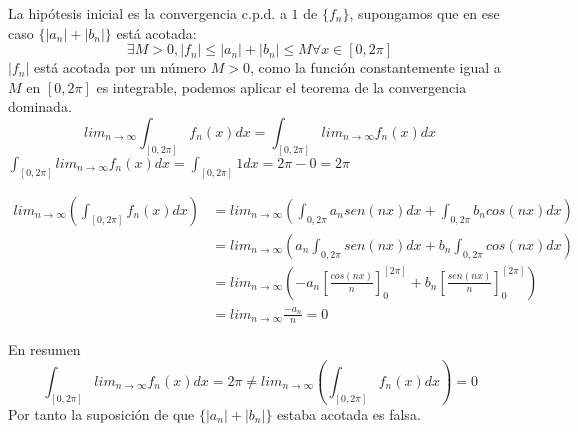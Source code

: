 
La hipótesis inicial es la convergencia c.p.d. a $1$ de $\{f_n\}$, supongamos que en ese caso $\{|a_n| + |b_n|\}$ está acotada:
\[\exists M>0, |f_n| \leq |a_n| + |b_n| \leq M \forall x\in [0, 2\pi] \]
$|f_n|$ está acotada por un número $M>0$, como la función constantemente igual a $M$ en $[0, 2\pi]$
es integrable, podemos aplicar el teorema de la convergencia dominada.
\[ lim_{n\to\infty}\int_{[0, 2\pi]} f_n(x)dx = \int_{[0, 2\pi]} lim_{n\to\infty} f_n(x)dx
\]
$ \int_{[0, 2\pi]} lim_{n\to\infty} f_n(x)dx = \int_{[0, 2\pi]} 1dx = 2\pi - 0 = 2\pi $

\begin{equation*}
\begin{split}
lim_{n\to\infty} \left( \int_[0, 2\pi] f_n(x)dx \right)
  & = lim_{n\to\infty} \left( \int_{0, 2\pi} a_nsen(nx)dx + \int_{0, 2\pi} b_ncos(nx)dx \right)
\\& = lim_{n\to\infty} \left( a_n\int_{0, 2\pi} sen(nx)dx + b_n\int_{0, 2\pi} cos(nx)dx \right)
\\& = lim_{n\to\infty} \left( -a_n \left[ \frac{cos(nx)}{n} \right]_0^{[2\pi]} 
					   + b_n \left[ \frac{sen(nx)}{n} \right]_0^{[2\pi]} \right)
\\& = lim_{n\to\infty} \frac{-a_n}{n} = 0
\end{split}
\end{equation*}
  
En resumen
\[ \int_{[0, 2\pi]} lim_{n\to\infty} f_n(x)dx = 2\pi \not =
	lim_{n\to\infty} \left( \int_[0, 2\pi] f_n(x)dx \right) = 0
\]
Por tanto la suposición de que $\{|a_n| + |b_n|\}$ estaba acotada es falsa.
  
